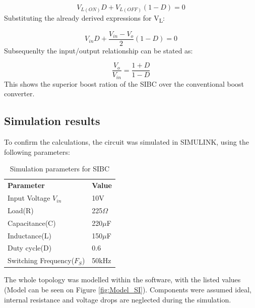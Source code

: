 \begin{equation}
	V_{L(ON)}D+V_{L(OFF)}(1-D)=0
	\label{eq:SI_IVSB}
\end{equation}
Substituting the already derived expressions for V\textsubscript{L}:

\begin{equation}
	V_{in}D+\frac{V_{in} - V_o}{2}(1-D)=0
	\label{eq:SI_IVSB2}
\end{equation}
Subsequenlty the input/output relationship can be stated as:

\begin{equation}
	\frac{V_o}{V_{in}} = \frac{1+D}{1-D}
	\label{eq:SI_VO_VIN}
\end{equation}
This shows the superior boost ration of the SIBC over the conventional boost converter. 

\subsection{Simulation results}

To confirm the calculations, the circuit was simulated in SIMULINK, using the following parameters: 

\begin{table}[H]
\begin{center}
\caption {Simulation parameters for SIBC} \label{tab:SI} 
\begin{tabular}{|l|l|}
\cline{1-2}
\textbf{Parameter} & \textbf{Value}  \\ \cline{1-2}
Input Voltage $V_{in}$          &      10V   \\ \cline{1-2}
Load(R)   & 225$\Omega$           \\ \cline{1-2}
Capacitance(C)          &       220$\mu$F     \\ \cline{1-2}
Inductance(L)          &      150$\mu$F      \\ \cline{1-2}
Duty cycle(D)          &     0.6       \\ \cline{1-2}
Switching Frequency($F_S$)          &      50kHz      \\ \cline{1-2}
\end{tabular}
\end{center}
\end{table}

The whole topology was modelled within the software, with the listed values (Model can be seen on Figure \ref{fig:Model_SI}). Components were assumed ideal, internal resistance and voltage drops are neglected during the simulation. 

